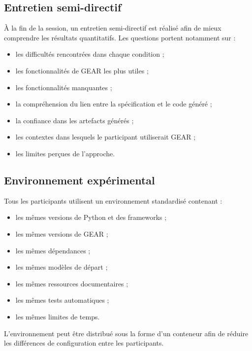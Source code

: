 \subsection{Entretien semi-directif}
\label{subsec:entretien-participants}

À la fin de la session, un entretien semi-directif est réalisé afin de
mieux comprendre les résultats quantitatifs. Les questions portent
notamment sur :

\begin{itemize}
    \item les difficultés rencontrées dans chaque condition ;
    \item les fonctionnalités de GEAR les plus utiles ;
    \item les fonctionnalités manquantes ;
    \item la compréhension du lien entre la spécification et le code
    généré ;
    \item la confiance dans les artefacts générés ;
    \item les contextes dans lesquels le participant utiliserait GEAR ;
    \item les limites perçues de l'approche.
\end{itemize}


\subsection{Environnement expérimental}
\label{subsec:environnement-experimental}

Tous les participants utilisent un environnement standardisé contenant :

\begin{itemize}
    \item les mêmes versions de Python et des frameworks ;
    \item les mêmes versions de GEAR ;
    \item les mêmes dépendances ;
    \item les mêmes modèles de départ ;
    \item les mêmes ressources documentaires ;
    \item les mêmes tests automatiques ;
    \item les mêmes limites de temps.
\end{itemize}

L'environnement peut être distribué sous la forme d'un conteneur afin
de réduire les différences de configuration entre les participants.

